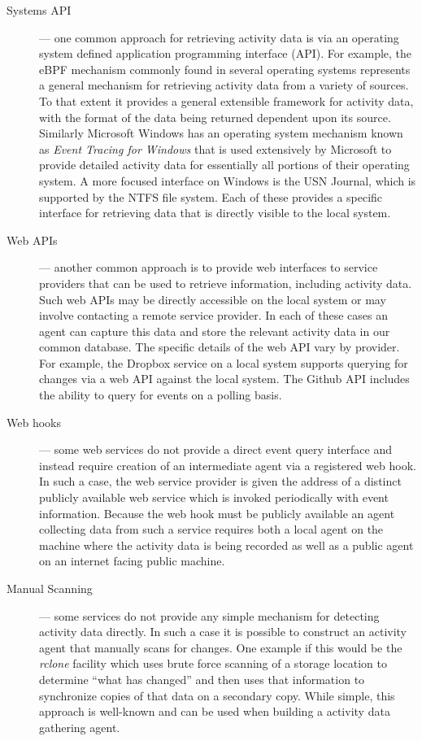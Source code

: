 \documentclass[sigconf,anonymous,review]{acmart}
\begin{document}
\begin{description}
    \item[Systems API] --- one common approach for retrieving activity data is
    via an operating system defined application programming interface (API).
    For example, the eBPF mechanism commonly found in several operating systems
    represents a general mechanism for retrieving activity data from a variety
    of sources.  To that extent it provides a general extensible framework for
    activity data, with the format of the data being returned dependent upon its
    source.  Similarly Microsoft Windows has an operating system mechanism known
    as \emph{Event Tracing for Windows} that is used extensively by Microsoft to
    provide detailed activity data for essentially all portions of their
    operating system.  A more focused interface on Windows is the USN Journal,
    which is supported by the NTFS file system.  Each of these provides a
    specific interface for retrieving data that is directly visible to the local
    system.

    \item[Web APIs] --- another common approach is to provide web interfaces to
    service providers that can be used to retrieve information, including
    activity data.  Such web APIs may be directly accessible on the local system
    or may involve contacting a remote service provider.  In each of these cases
    an agent can capture this data and store the relevant activity data in our
    common database. The specific details of the web API vary by provider.
    For example, the Dropbox service on a local system supports querying for changes via a
    web API against the local system.  The Github API includes the ability to
    query for events on a polling basis.

    \item[Web hooks] --- some web services do not provide a direct event query
    interface and instead require creation of an intermediate agent via a
    registered web hook.  In such a case, the web service provider is given the
    address of a distinct publicly available web service which is invoked
    periodically with event information. Because the web hook must be publicly
    available an agent collecting data from such a service requires both a local
    agent on the machine where the activity data is being recorded as well as a
    public agent on an internet facing public machine.

    \item[Manual Scanning] --- some services do not provide any simple mechanism
    for detecting activity data directly.  In such a case it is possible to
    construct an activity agent that manually scans for changes.  One example if
    this would be the \emph{rclone} facility which uses brute force scanning of
    a storage location to determine ``what has changed'' and then uses that
    information to synchronize copies of that data on a secondary copy.  While
    simple, this approach is well-known and can be used when building a activity
    data gathering agent.
\end{description}
\end{document}
